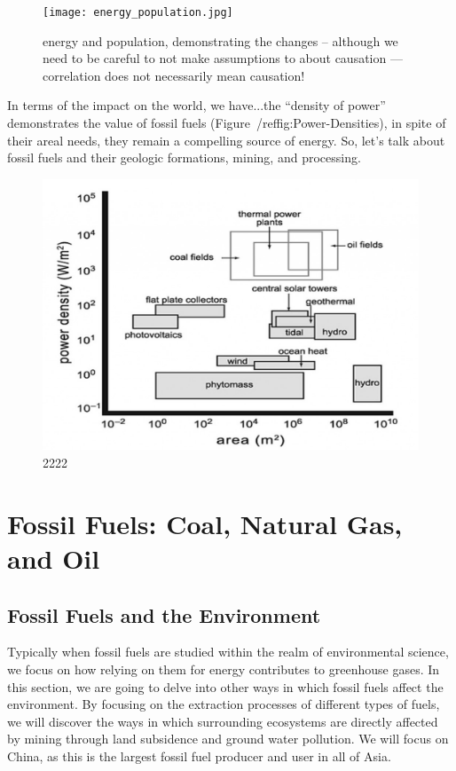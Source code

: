 \begin{figure}[h!]
	\centering
		\texttt{[image: energy\_population.jpg]}
	\caption{energy and population, demonstrating the changes -- although we need to be careful to not make assumptions to about causation --- correlation does not necessarily mean causation!}
	\label{fig:energy_population}
\end{figure}

In terms of the impact on the world, we have...the ``density of power'' demonstrates the value of fossil fuels (Figure~/ref{fig:Power-Densities}), in spite of their areal needs, they remain a compelling source of energy. So, let's talk about fossil fuels and their geologic formations, mining, and processing.


\begin{figure}[h]
	\centering
		\includegraphics[width=1.00\textwidth]{graphics/Power-Densities.jpg}
	\caption{2222}
	\label{fig:Power-Densities}
\end{figure}


\section{Fossil Fuels: Coal, Natural Gas, and Oil}

\subsection{Fossil Fuels and the Environment}

Typically when fossil fuels are studied within the realm of environmental science, we focus on how relying on them for energy contributes to greenhouse gases. In this section, we are going to delve into other ways in which fossil fuels affect the environment. By focusing on the extraction processes of different types of fuels, we will discover the ways in which surrounding ecosystems are directly affected by mining through land subsidence and ground water pollution. We will focus on China, as this is the largest fossil fuel producer and user in all of Asia. 

